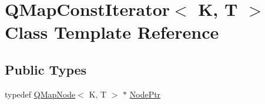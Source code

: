 \hypertarget{class_q_map_const_iterator}{}\section{Q\+Map\+Const\+Iterator$<$ K, T $>$ Class Template Reference}
\label{class_q_map_const_iterator}
\subsection*{Public Types}
\begin{DoxyCompactItemize}
\item 
typedef \mbox{\hyperlink{struct_q_map_node}{Q\+Map\+Node}}$<$ K, T $>$ $\ast$ \mbox{\hyperlink{class_q_map_const_iterator_aa466b226e8b1a5bb8dde734c504609c1}{Node\+Ptr}}
\end{DoxyCompactItemize}

